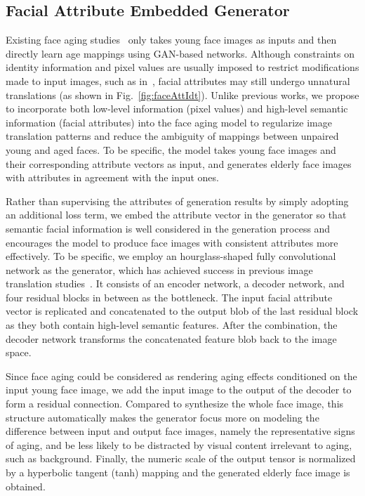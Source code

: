 \documentclass[10pt,twocolumn,letterpaper]{article}
\begin{document}
\subsection{Facial Attribute Embedded Generator}
Existing face aging studies~\cite{yang2017learning,li2018global,zhang2017age} only takes young face images as inputs and then directly learn age mappings using GAN-based networks.
Although constraints on identity information and pixel values are usually imposed to restrict modifications made to input images, such as in~\cite{yang2017learning}, facial attributes may still undergo unnatural translations (as shown in Fig.~\ref{fig:faceAttIdt}).
Unlike previous works, we propose to incorporate both low-level information (pixel values) and high-level semantic information (facial attributes) into the face aging model to regularize image translation patterns and reduce the ambiguity of mappings between unpaired young and aged faces.
To be specific, the model takes young face images and their corresponding attribute vectors as input, and generates elderly face images with attributes in agreement with the input ones. 

Rather than supervising the attributes of generation results by simply adopting an additional loss term, we embed the attribute vector in the generator so that semantic facial information is well considered in the generation process and encourages the model to produce face images with consistent attributes more effectively.
To be specific, we employ an hourglass-shaped fully convolutional network as the generator, which has achieved success in previous image translation studies~\cite{johnson2016perceptual,zhu2017unpaired}. It consists of an encoder network, a decoder network, and four residual blocks in between as the bottleneck.
The input facial attribute vector is replicated and concatenated to the output blob of the last residual block as they both contain high-level semantic features. After the combination, the decoder network transforms the concatenated feature blob back to the image space. 

Since face aging could be considered as rendering aging effects conditioned on the input young face image, we add the input image to the output of the decoder to form a residual connection. 
Compared to synthesize the whole face image, this structure automatically makes the generator focus more on modeling the difference between input and output face images, namely the representative signs of aging, and be less likely to be distracted by visual content irrelevant to aging, such as background.
Finally, the numeric scale of the output tensor is normalized by a hyperbolic tangent (tanh) mapping and the generated elderly face image is obtained.
\end{document}
